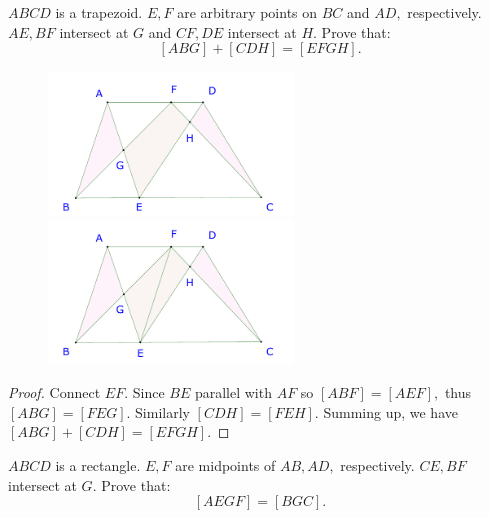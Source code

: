 \documentclass{article}
\begin{document}
\newpage

\begin{example*}[Example 12]
    $ABCD$ is a trapezoid. $E, F$ are arbitrary points on $BC$ and $AD,$ respectively.
    $AE, BF$ intersect at $G$ and $CF, DE$ intersect at $H.$ Prove that:
    \[
        [ABG] + [CDH] = [EFGH].
    \]
\end{example*}

\begin{figure}[h]
    \centering
    \begin{minipage}[t]{6.5cm}
        \begin{center}
            \includegraphics[width=6.5cm]{./svg/pdf/23-24-s3-i-p13.pdf}
        \end{center}
    \end{minipage}
    \qquad
    \begin{minipage}[t]{6.5cm}
        \centering
        \begin{center}
            \includegraphics[width=6.5cm]{./svg/pdf/23-24-s3-i-p13-s.pdf}
        \end{center}
    \end{minipage}
\end{figure}

\begin{proof}
    Connect $EF.$ Since $BE$ parallel with $AF$ so $[ABF] = [AEF],$ thus $[ABG] = [FEG].$
    Similarly $[CDH]=[FEH].$
    Summing up, we have $[ABG] + [CDH] = [EFGH].$
\end{proof}

\begin{example*}[Example 13]
    $ABCD$ is a rectangle. $E, F$ are midpoints of $AB, AD,$ respectively.
    $CE, BF$ intersect at $G.$ Prove that:
    \[
        [AEGF] = [BGC].
    \]
\end{example*}
\end{document}
